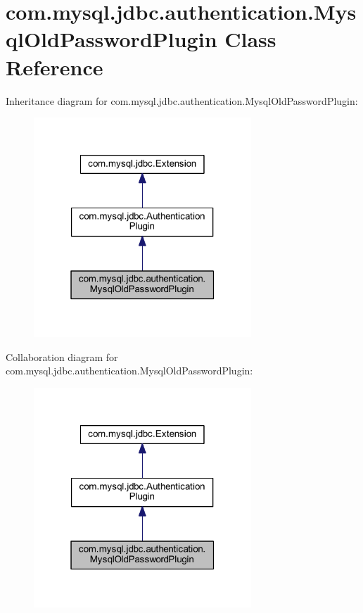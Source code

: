\hypertarget{classcom_1_1mysql_1_1jdbc_1_1authentication_1_1_mysql_old_password_plugin}{}\section{com.\+mysql.\+jdbc.\+authentication.\+Mysql\+Old\+Password\+Plugin Class Reference}
\label{classcom_1_1mysql_1_1jdbc_1_1authentication_1_1_mysql_old_password_plugin}


Inheritance diagram for com.\+mysql.\+jdbc.\+authentication.\+Mysql\+Old\+Password\+Plugin\+:
\nopagebreak
\begin{figure}[H]
\begin{center}
\leavevmode
\includegraphics[width=232pt]{classcom_1_1mysql_1_1jdbc_1_1authentication_1_1_mysql_old_password_plugin__inherit__graph}
\end{center}
\end{figure}


Collaboration diagram for com.\+mysql.\+jdbc.\+authentication.\+Mysql\+Old\+Password\+Plugin\+:
\nopagebreak
\begin{figure}[H]
\begin{center}
\leavevmode
\includegraphics[width=232pt]{classcom_1_1mysql_1_1jdbc_1_1authentication_1_1_mysql_old_password_plugin__coll__graph}
\end{center}
\end{figure}

